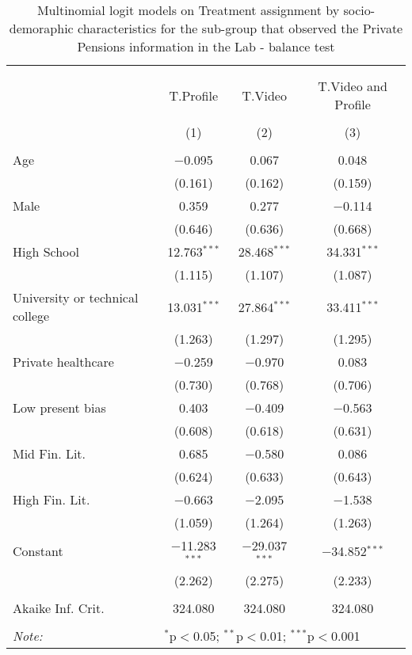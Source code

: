 
\begin{table}[H] \centering 
  \caption{Multinomial logit models on Treatment assignment by socio-demoraphic characteristics for the sub-group that observed the Private Pensions information in the Lab  - balance test} 
  \label{tbl:balance_private_lab} 
\begin{tabular}{@{\extracolsep{5pt}}lccc} 
\\[-1.8ex]\hline 
\hline \\[-1.8ex] 
\\[-1.8ex] & T.Profile & T.Video & T.Video and Profile \\ 
\\[-1.8ex] & (1) & (2) & (3)\\ 
\hline \\[-1.8ex] 
 Age & $-$0.095 & 0.067 & 0.048 \\ 
  & (0.161) & (0.162) & (0.159) \\ 
  Male & 0.359 & 0.277 & $-$0.114 \\ 
  & (0.646) & (0.636) & (0.668) \\ 
  High School & 12.763$^{***}$ & 28.468$^{***}$ & 34.331$^{***}$ \\ 
  & (1.115) & (1.107) & (1.087) \\ 
  University or technical college & 13.031$^{***}$ & 27.864$^{***}$ & 33.411$^{***}$ \\ 
  & (1.263) & (1.297) & (1.295) \\ 
  Private healthcare & $-$0.259 & $-$0.970 & 0.083 \\ 
  & (0.730) & (0.768) & (0.706) \\ 
  Low present bias & 0.403 & $-$0.409 & $-$0.563 \\ 
  & (0.608) & (0.618) & (0.631) \\ 
  Mid Fin. Lit. & 0.685 & $-$0.580 & 0.086 \\ 
  & (0.624) & (0.633) & (0.643) \\ 
  High Fin. Lit. & $-$0.663 & $-$2.095 & $-$1.538 \\ 
  & (1.059) & (1.264) & (1.263) \\ 
  Constant & $-$11.283$^{***}$ & $-$29.037$^{***}$ & $-$34.852$^{***}$ \\ 
  & (2.262) & (2.275) & (2.233) \\ 
 \hline \\[-1.8ex] 
Akaike Inf. Crit. & 324.080 & 324.080 & 324.080 \\ 
\hline 
\hline \\[-1.8ex] 
\textit{Note:}  & \multicolumn{3}{l}{$^{*}$p$<$0.05; $^{**}$p$<$0.01; $^{***}$p$<$0.001} \\ 
\end{tabular} 
\end{table} 
